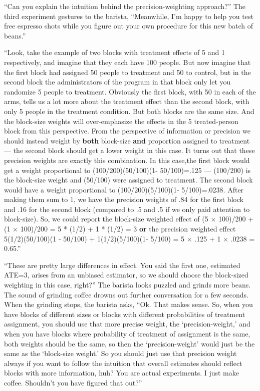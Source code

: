 \documentclass[
]{article}
\begin{document}
``Can you explain the intuition behind the precision-weighting approach?'' The third experiment gestures to the barista, ``Meanwhile, I'm happy to help you test free espresso shots while you figure out your own procedure for this new batch of beans.''

``Look, take the example of two blocks with treatment effects of 5 and 1
respectively, and imagine that they each have 100 people. But now imagine that
the first block had assigned 50 people to treatment and 50 to control, but in
the second block the administrators of the program in that block only let you
randomize 5 people to treatment. Obviously the first block, with 50 in each of
the arms, tells us a lot more about the treatment effect than the second block,
with only 5 people in the treatment condition. But both blocks are the same
size. And the block-size weights will over-emphasize the effects in the 5
treated-person block from this perspective. From the perspective of information
or precision we should instead weight by \textbf{both} block-size \textbf{and} proportion
assigned to treatment --- the second block should get a lower weight in this
case. It turns out that these precision weights are exactly this combination.
In this case,the first block would get a weight proportional to (100/200)(50/100)(1-
50/100)=.125 --- (100/200) is the block-size weight and (50/100) were assigned
to treatment. The second block would have a weight proportional to (100/200)(5/100)(1-
5/100)=.0238. After making them sum to 1, we have the precision weights of .84 for the first
block and .16 for the second block (compared to .5 and .5 if we only paid
attention to block-size). So, we could report the block-size weighted effect of (5 \(\times\)
100)/200 + (1 \(\times\) 100)/200 = 5 * (1/2) + 1 * (1/2) = 3 \textbf{or} the precision weighted effect 5(1/2)(50/100)(1 - 50/100) +
1(1/2)(5/100)(1- 5/100) = 5 \(\times\) .125 + 1 \(\times\) .0238 = 0.65.''

``These are pretty large differences in effect. You said the first one, estimated ATE=3, arises from an unbiased estimator, so we should choose the block-sized weighting in this case, right?'' The barista looks puzzled and grinds more beans. The sound of grinding coffee drowns out further conversation for a few seconds. When the grinding stops, the barista asks, ``Ok. That makes sense. So, when you have blocks of different sizes or blocks with different probabilities of treatment assignment, you should use that more precise weight, the `precision-weight,' and when you have blocks where probability of treatment of assignment is the same, both weights should be the same, so then the `precision-weight' would just be the same as the `block-size weight.' So you should just use that precision weight always if you want to follow the intuition that overall estimates should reflect blocks with more information, huh? You are actual experiments. I just make coffee. Shouldn't you have figured that out?''
\end{document}
